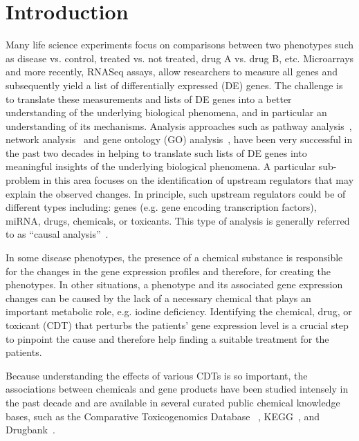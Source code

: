 \section{Introduction}
\label{chap:Introduction}


Many life science experiments focus on comparisons between two phenotypes such as disease vs. control, treated vs. not treated, drug A vs. drug B, etc. Microarrays and more recently, RNASeq assays, allow researchers to measure all genes and subsequently  yield a list of differentially expressed (DE) genes. The challenge is to translate these measurements and lists of DE genes into a better understanding of the underlying biological phenomena, and in particular an understanding of its mechanisms. %
Analysis approaches such as pathway analysis~\cite{DraghiciOntologicalToolsReview:2005,Khatri:2012, mitrea2013methods, tarca2013comparison, nguyen2018network, ihnatova2018critical, nguyen2019identifying}, network analysis~\cite{mitra2013integrative} and gene ontology (GO) analysis~\cite{DraghiciOntologicalToolsReview:2005,Rhee:2008}, have been very successful in the past two decades in helping to translate such lists of DE genes into meaningful insights of the underlying biological phenomena. A particular sub-problem in this area focuses on the identification of upstream regulators that may explain the observed changes. In principle, such upstream regulators could be of different types including: genes (e.g. gene encoding transcription factors), miRNA, drugs, chemicals, or toxicants. This type of analysis is generally referred to as ``causal analysis''~\cite{schadt:2005, chindelevitch2012causal, kramer2013causal, felciano2013predictive}. 


In some disease phenotypes, the presence of a chemical substance  is responsible for the changes in  the gene expression profiles and  therefore, for creating the phenotypes. 
In other situations,  a phenotype and its associated  gene expression changes  can be caused by the lack of a necessary chemical  that plays an important metabolic role, e.g. iodine deficiency. 
Identifying the chemical, drug, or toxicant (CDT) that perturbs the patients' gene expression level is a crucial step to pinpoint the cause and therefore help finding a suitable treatment for the patients.


Because understanding the effects of various CDTs is so important, the associations between chemicals and gene products have been studied intensely in the past decade and are available in several curated public chemical knowledge bases, such as the Comparative Toxicogenomics Database ~\cite{mattingly2006comparative}, KEGG~\cite{Kanehisa:2000}, and Drugbank~\cite{law2014drugbank}. 

